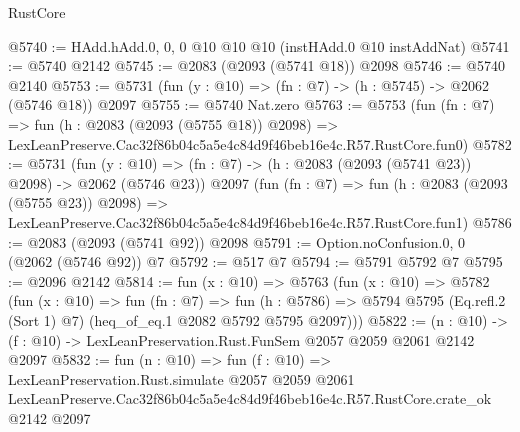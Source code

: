 \begin{lexlean}{RustCore}
\begin{coremodule}
@5740 := HAdd.hAdd.{0, 0, 0} @10 @10 @10 (instHAdd.{0} @10 instAddNat)
@5741 := @5740 @2142
@5745 := @2083 (@2093 (@5741 @18)) @2098
@5746 := @5740 @2140
@5753 := @5731 (fun (y : @10) => (fn : @7) -> (h : @5745) -> @2062 (@5746 @18)) @2097
@5755 := @5740 Nat.zero
@5763 := @5753
    (fun (fn : @7) =>
    fun (h : @2083 (@2093 (@5755 @18)) @2098) =>
    LexLeanPreserve.Cac32f86b04c5a5e4c84d9f46beb16e4c.R57.RustCore.fun0)
@5782 := @5731
    (fun (y : @10) => (fn : @7) -> (h : @2083 (@2093 (@5741 @23)) @2098) -> @2062 (@5746 @23))
    @2097
    (fun (fn : @7) =>
    fun (h : @2083 (@2093 (@5755 @23)) @2098) =>
    LexLeanPreserve.Cac32f86b04c5a5e4c84d9f46beb16e4c.R57.RustCore.fun1)
@5786 := @2083 (@2093 (@5741 @92)) @2098
@5791 := Option.noConfusion.{0, 0} (@2062 (@5746 @92)) @7
@5792 := @517 @7
@5794 := @5791 @5792 @7
@5795 := @2096 @2142
@5814 := fun (x : @10) =>
  @5763
    (fun (x : @10) =>
    @5782
      (fun (x : @10) =>
      fun (fn : @7) =>
      fun (h : @5786) =>
      @5794 @5795 (Eq.refl.{2} (Sort 1) @7) (heq_of_eq.{1} @2082 @5792 @5795 @2097)))
@5822 := (n : @10) -> (f : @10) -> LexLeanPreservation.Rust.FunSem @2057 @2059 @2061 @2142 @2097
@5832 := fun (n : @10) =>
  fun (f : @10) =>
  LexLeanPreservation.Rust.simulate
    @2057
    @2059
    @2061
    LexLeanPreserve.Cac32f86b04c5a5e4c84d9f46beb16e4c.R57.RustCore.crate_ok
    @2142
    @2097
\end{coremodule}
\end{lexlean}

